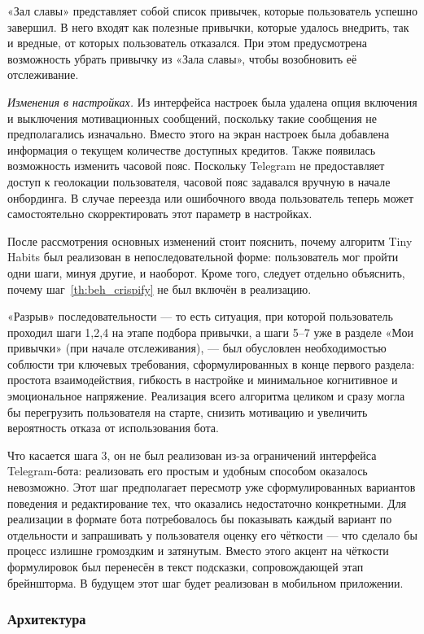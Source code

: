 \documentclass[pdflatex,sn-mathphys-num]{sn-jnl}%
\theoremstyle{thmstyleone}%
\theoremstyle{thmstyletwo}%
\theoremstyle{thmstylethree}%
\begin{document}
«Зал славы» представляет собой список привычек, которые пользователь успешно завершил. В него входят как полезные привычки, которые удалось внедрить, так и вредные, от которых пользователь отказался. При этом предусмотрена возможность убрать привычку из «Зала славы», чтобы возобновить её отслеживание.

\textit{Изменения в настройках.} Из интерфейса настроек была удалена опция включения и выключения мотивационных сообщений, поскольку такие сообщения не предполагались изначально. Вместо этого на экран настроек была добавлена информация о текущем количестве доступных кредитов. Также появилась возможность изменить часовой пояс. Поскольку Telegram не предоставляет доступ к геолокации пользователя, часовой пояс задавался вручную в начале онбординга. В случае переезда или ошибочного ввода пользователь теперь может самостоятельно скорректировать этот параметр в настройках.

После рассмотрения основных изменений стоит пояснить, почему алгоритм Tiny Habits был реализован в непоследовательной форме: пользователь мог пройти одни шаги, минуя другие, и наоборот. Кроме того, следует отдельно объяснить, почему шаг~\ref{th:beh_crispify} не был включён в реализацию.

«Разрыв» последовательности — то есть ситуация, при которой пользователь проходил шаги 1,2,4 на этапе подбора привычки, а шаги 5–7 уже в разделе «Мои привычки» (при начале отслеживания), — был обусловлен необходимостью соблюсти три ключевых требования, сформулированных в конце первого раздела: простота взаимодействия, гибкость в настройке и минимальное когнитивное и эмоциональное напряжение. Реализация всего алгоритма целиком и сразу могла бы перегрузить пользователя на старте, снизить мотивацию и увеличить вероятность отказа от использования бота.

Что касается шага 3, он не был реализован из-за ограничений интерфейса Telegram-бота: реализовать его простым и удобным способом оказалось невозможно. Этот шаг предполагает пересмотр уже сформулированных вариантов поведения и редактирование тех, что оказались недостаточно конкретными. Для реализации в формате бота потребовалось бы показывать каждый вариант по отдельности и запрашивать у пользователя оценку его чёткости — что сделало бы процесс излишне громоздким и затянутым. Вместо этого акцент на чёткости формулировок был перенесён в текст подсказки, сопровождающей этап брейншторма. В будущем этот шаг будет реализован в мобильном приложении.

\subsubsection{Архитектура}
\end{document}
